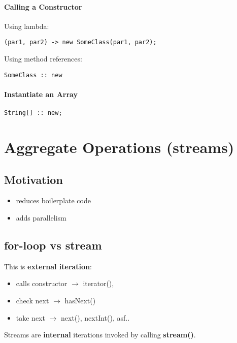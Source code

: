 \documentclass{report}
\begin{document}
\subsubsection*{Calling a Constructor}
Using lambda:
\begin{verbatim}
(par1, par2) -> new SomeClass(par1, par2);
\end{verbatim}
Using method references:
\begin{verbatim}
SomeClass :: new
\end{verbatim}

\subsubsection*{Instantiate an Array}
\begin{verbatim}
String[] :: new;
\end{verbatim}




\chapter{Aggregate Operations (streams)}
\section{Motivation}
\begin{itemize}
	\item reduces boilerplate code
	\item adds parallelism
\end{itemize}

\section{for-loop vs stream}
This is \textbf{external iteration}:
\begin{itemize}
	\item calls constructor $\rightarrow$ iterator(),
	\item check next $\rightarrow$ hasNext()	
	\item take next $\rightarrow$ next(), nextInt(), asf..
\end{itemize}

Streams are \textbf{internal} iterations invoked by calling \textbf{stream()}. 
\end{document}
